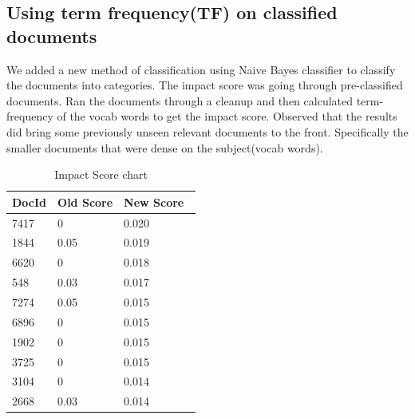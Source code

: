 \documentclass{article}
\begin{document}
\subsection{Using term frequency(TF) on classified documents}
We added a new method of classification using Naive Bayes classifier to classify the documents into categories.
The impact score was going through pre-classified documents. Ran the documents through a cleanup and then calculated term-frequency of the vocab words to get the impact score.
Observed that the results did bring some previously unseen relevant documents to the front. Specifically the smaller documents that were dense on the subject(vocab words).
\begin{table}[ht]
\caption{Impact Score chart} %
\centering %
\begin{tabular}{|p{3cm}|p{3cm}|p{3cm}| } %
\hline\hline %
DocId & Old Score & New Score\ \\ [0.5ex] %
\hline %
7417 & 0
  & 0.020 \\ %
  1844 & 0.05
  & 0.019 \\ %
  6620 & 0
  & 0.018 \\ %
  548 & 0.03
  & 0.017 \\ %
  7274 & 0.05
  & 0.015 \\ %
    6896 & 0
  & 0.015 \\ %
    1902 & 0
  & 0.015 \\ %
    3725 & 0
  & 0.015 \\ %
    3104 & 0
  & 0.014 \\ %
    2668 & 0.03
  & 0.014 \\  [1ex] %
\hline %
\end{tabular}
\label{table:nonlin} %
\end{table}


\maketitle
\end{document}
